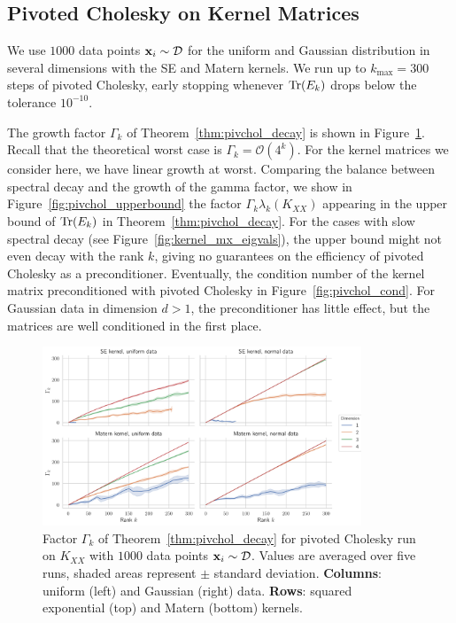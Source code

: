 \documentclass{article}
\begin{document}
{\subsection{Pivoted Cholesky on Kernel Matrices}

We use $1000$ data points $\boldsymbol{\mathbf{x}}_i \sim \mathcal D$ for the uniform and Gaussian distribution in several dimensions with the SE and Matern kernels. We run up to $k_{\max} = 300$ steps of pivoted Cholesky, early stopping whenever $\operatorname{Tr}(E_k)$ drops below the tolerance $10^{-10}$. 

The growth factor $\Gamma_k$ of Theorem~\ref{thm:pivchol_decay} is shown in Figure~\ref{fig:pivchol_gamma}. Recall that the theoretical worst case is $\Gamma_k = \mathcal O(4^k)$. For the kernel matrices we consider here, we have linear growth at worst. 
Comparing the balance between spectral decay and the growth of the gamma factor, we show in Figure~\ref{fig:pivchol_upperbound} the factor $\Gamma_k \lambda_k(K_{XX})$ appearing in the upper bound of $\operatorname{Tr}(E_k)$ in Theorem~\ref{thm:pivchol_decay}. For the cases with slow spectral decay (see Figure~\ref{fig:kernel_mx_eigvals}), the upper bound might not even decay with the rank $k$, giving no guarantees on the efficiency of pivoted Cholesky as a preconditioner. 
Eventually, the condition number of the kernel matrix preconditioned with pivoted Cholesky in Figure~\ref{fig:pivchol_cond}. For Gaussian data in dimension $d> 1$, the preconditioner has little effect, but the matrices are well conditioned in the first place.

\begin{figure}
    \centering
    \includegraphics[width=0.85\textwidth]{report/res/pivchol_gamma.pdf}
    \caption{Factor $\Gamma_k$ of Theorem~\ref{thm:pivchol_decay} for pivoted Cholesky run on $K_{XX}$ with $1000$ data points $\boldsymbol{\mathbf{x}}_i \sim \mathcal D$. Values are averaged over five runs, shaded areas represent $\pm$ standard deviation. \textbf{Columns}: uniform (left) and Gaussian (right) data. \textbf{Rows}: squared exponential (top) and Matern (bottom) kernels. }
    \label{fig:pivchol_gamma}
\end{figure}

}
\end{document}
